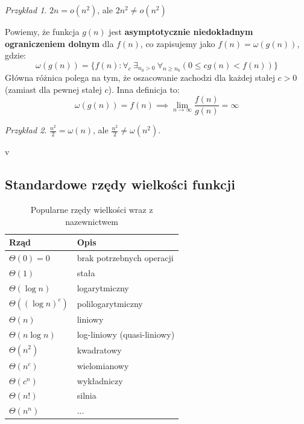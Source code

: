 \documentclass[10pt, oneside]{article}
\theoremstyle{remark}
\newtheorem*{example}{Przykład}
\begin{document}
\begin{example}
$2n = o(n^2)$, ale $2n^2 \neq o(n^2)$
\end{example}

Powiemy, że funkcja $g(n)$ jest \textbf{asymptotycznie niedokładnym ograniczeniem dolnym} dla $f(n)$, co zapisujemy jako $f(n)=\omega(g(n))$, gdzie:
$$
\omega(g(n)) = \{ f(n): \forall_{c}\ \exists_{n_0>0}\ \forall_{n \geq n_0} \left(0 \leq c g(n) < f(n)  \right) \}
$$
Główna różnica polega na tym, że oszacowanie zachodzi dla każdej stałej $c>0$ (zamiast dla pewnej stałej $c$).
Inna definicja to:
$$
\omega(g(n)) = f(n) \implies \lim_{n \to \infty} \frac{f(n)}{g(n)} = \infty
$$

\begin{example}
$\frac{n^2}{2} = \omega(n)$, ale $\frac{n^2}{2} \neq \omega(n^2)$.
\end{example}


v

\subsection{Standardowe rzędy wielkości funkcji}

\begin{table}[]
\caption{Popularne rzędy wielkości wraz z nazewnictwem}
\centering
\begin{tabular}{@{}ll@{}}
\toprule
Rząd & Opis \\ \midrule
$\Theta(0)=0$ & brak potrzebnych operacji \\
$\Theta(1)$ & stała \\
$\Theta(\log n)$ & logarytmiczny \\
$\Theta((\log n)^c)$ & polilogarytmiczny \\
$\Theta(n)$ & liniowy \\
$\Theta(n \log n)$ & log-liniowy (quasi-liniowy) \\
$\Theta(n^2)$ & kwadratowy \\
$\Theta(n^c)$ & wielomianowy \\
$\Theta(c^n)$ & wykładniczy \\
$\Theta(n!)$ & silnia \\ 
$\Theta(n^n)$ & ... \\ \bottomrule
\end{tabular}
\end{table}
\end{document}
